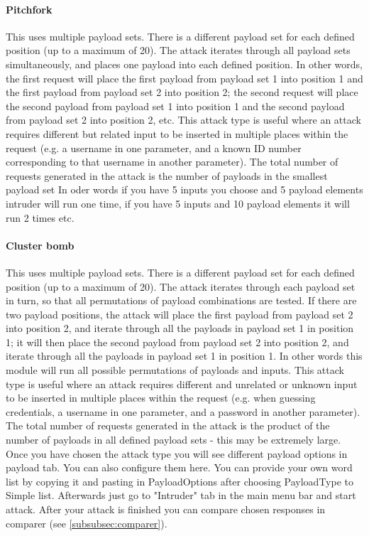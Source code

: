 \paragraph{Pitchfork}
This uses multiple payload sets.
There is a different payload set for each defined position (up to a maximum of 20).
The attack iterates through all payload sets simultaneously, and places one payload into each defined position.
In other words, the first request will place the first payload from payload set 1 into position 1 and the first payload from payload set 2 into position 2;
the second request will place the second payload from payload set 1 into position 1 and the second payload from payload set 2 into position 2, etc.
This attack type is useful where an attack requires different but related input to be inserted in multiple places within the request (e.g. a username in one parameter, and a known ID number corresponding to that username in another parameter).
The total number of requests generated in the attack is the number of payloads in the smallest payload set
In oder words if you have 5 inputs you choose and 5  payload elements intruder will run one time, if you have 5 inputs and 10 payload elements it will run 2 times etc.
\paragraph{Cluster bomb}
This uses multiple payload sets.
There is a different payload set for each defined position (up to a maximum of 20).
The attack iterates through each payload set in turn, so that all permutations of payload combinations are tested.
If there are two payload positions, the attack will place the first payload from payload set 2 into position 2, and iterate through all the payloads in payload set 1 in position 1;
it will then place the second payload from payload set 2 into position 2, and iterate through all the payloads in payload set 1 in position 1.
In other words this module will run all possible permutations of payloads and inputs.
This attack type is useful where an attack requires different and unrelated or unknown input to be inserted in multiple places within the request (e.g. when guessing credentials, a username in one parameter, and a password in another parameter).
The total number of requests generated in the attack is the product of the number of payloads in all defined payload sets - this may be extremely large.
\newline
Once you have chosen the attack type you will see different payload options in payload tab.
You can also configure them here.
You can provide your own word list by copying it and pasting in PayloadOptions after choosing PayloadType to Simple list.
Afterwards just go to "Intruder" tab in the main menu bar and start attack.
After your attack is finished you can compare chosen responses in comparer (see \ref{subsubsec:comparer}).

